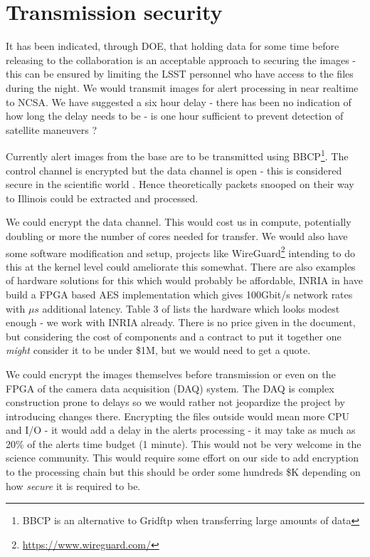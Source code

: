 \section{Transmission security} \label{sec:trans}

It has been indicated, through DOE, that holding data for some time before releasing to the collaboration is an acceptable approach to securing the images - this can be ensured by limiting the LSST personnel who have access to the files during the night.
We would transmit images for alert processing in near realtime to NCSA. We have suggested a six hour delay - there has been no indication of how long the delay needs to be - is one hour sufficient to prevent detection of satellite maneuvers ?

Currently alert images from the base are to be transmitted using BBCP\footnote{BBCP is an alternative to Gridftp when transferring large amounts of data}. The control channel is encrypted but the data channel is open - this is considered secure in the scientific world \citep{bbcp}. Hence theoretically packets snooped on their way to Illinois could be extracted and processed.


We could encrypt the data  channel. This would cost us in  compute, potentially  doubling or more the number of cores needed for transfer. We would also have some software modification and setup, projects like WireGuard\footnote{\url{https://www.wireguard.com/}} intending to do this at the kernel level could ameliorate this somewhat.
There are also  examples of hardware solutions for this which would probably be affordable, INRIA in \cite{10.1007/978-3-642-45073-0_1} have build a FPGA based AES\cite{aes} implementation  which gives 100Gbit/s network rates with $\mu s$ additional latency. Table 3 of \cite{10.1007/978-3-642-45073-0_1} lists the hardware which looks modest enough - we work with INRIA already. There is no price given in the document, but considering the cost of components and a contract to put it together one \emph{might} consider it to be  under \$1M, but we would need to get a quote.

We could encrypt the images themselves before transmission or even on the FPGA of the camera data acquisition (DAQ) system.  The DAQ is complex construction prone to delays so we would rather not jeopardize the project by introducing changes there. Encrypting the files outside would mean more CPU and I/O - it would add a delay in the alerts processing - it may take as much as 20\% of the alerts time budget (1 minute).  This would not be very welcome in the science community. This would require some effort on our side to add encryption to the processing chain but this should be order some hundreds \$K depending on how \emph{secure} it is required to be.



